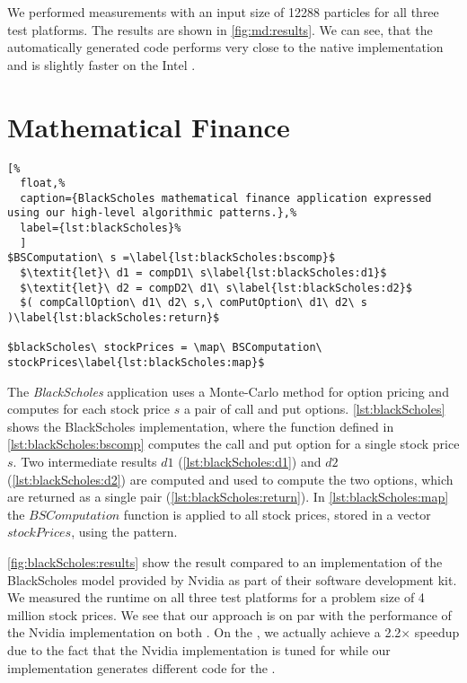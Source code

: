 We performed measurements with an input size of 12288 particles for all three test platforms.
The results are shown in \autoref{fig:md:results}.
We can see, that the automatically generated \OpenCL code performs very close to the native \OpenCL implementation and is slightly faster on the Intel \CPU.



\section{Mathematical Finance}

\begin{lstlisting}[%
  float,%
  caption={BlackScholes mathematical finance application expressed using our high-level algorithmic patterns.},%
  label={lst:blackScholes}%
  ]
$BSComputation\ s =\label{lst:blackScholes:bscomp}$
  $\textit{let}\ d1 = compD1\ s\label{lst:blackScholes:d1}$
  $\textit{let}\ d2 = compD2\ d1\ s\label{lst:blackScholes:d2}$
  $( compCallOption\ d1\ d2\ s,\ comPutOption\ d1\ d2\ s )\label{lst:blackScholes:return}$

$blackScholes\ stockPrices = \map\ BSComputation\ stockPrices\label{lst:blackScholes:map}$
\end{lstlisting}

The \emph{BlackScholes} application uses a Monte-Carlo method for option pricing and computes for each stock price $s$ a pair of call and put options.
\autoref{lst:blackScholes} shows the BlackScholes implementation, where the function defined in \autoref{lst:blackScholes:bscomp} computes the call and put option for a single stock price $s$.
Two intermediate results $d1$ (\autoref{lst:blackScholes:d1}) and $d2$ (\autoref{lst:blackScholes:d2}) are computed and used to compute the two options, which are returned as a single pair (\autoref{lst:blackScholes:return}).
In \autoref{lst:blackScholes:map} the $BSComputation$ function is applied to all stock prices, stored in a vector $stockPrices$, using the \map pattern.


\autoref{fig:blackScholes:results} show the result compared to an \OpenCL implementation of the BlackScholes model provided by Nvidia as part of their software development kit.
We measured the runtime on all three test platforms for a problem size of 4 million stock prices.
We see that our approach is on par with the performance of the Nvidia implementation on both \GPUs.
On the \CPU, we actually achieve a 2.2$\times$ speedup due to the fact that the Nvidia implementation is tuned for \GPUs while our implementation generates different code for the \CPU.







